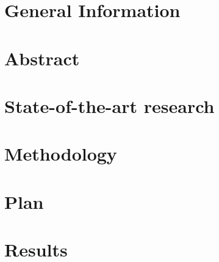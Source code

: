 \documentclass[10pt,notitlepage]{article}
\begin{document}
\section{General Information}
\label{sec:General}


\section{Abstract}
\label{sec:Introduction}


%

\section{State-of-the-art research}
\label{sec:SOTA}



\section{Methodology}
\label{sec:Methodology}


\section{Plan}
\label{sec:Plan}




\section{Results}
\label{sec:Results}



%

%





\end{document}
